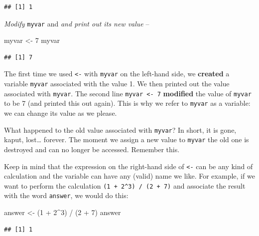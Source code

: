 \documentclass[
]{book}
\newenvironment{Shaded}{\begin{snugshade}}{\end{snugshade}}
\newcommand{\DecValTok}[1]{\textcolor[rgb]{0.00,0.00,0.81}{#1}}
\newcommand{\NormalTok}[1]{#1}
\newcommand{\OtherTok}[1]{\textcolor[rgb]{0.56,0.35,0.01}{#1}}
\newcommand{\SpecialCharTok}[1]{\textcolor[rgb]{0.00,0.00,0.00}{#1}}
\begin{document}
\begin{verbatim}
## [1] 1
\end{verbatim}

\emph{Modify} \texttt{myvar} and \emph{and print out its new value} --

\begin{Shaded}
\begin{Highlighting}[]
\NormalTok{myvar }\OtherTok{\textless{}{-}} \DecValTok{7}
\NormalTok{myvar}
\end{Highlighting}
\end{Shaded}

\begin{verbatim}
## [1] 7
\end{verbatim}

The first time we used \texttt{\textless{}-} with \texttt{myvar} on the left-hand side, we \textbf{created} a variable \texttt{myvar} associated with the value 1. We then printed out the value associated with \texttt{myvar}. The second line \texttt{myvar\ \textless{}-\ 7} \textbf{modified} the value of \texttt{myvar} to be 7 (and printed this out again). This is why we refer to \texttt{myvar} as a variable: we can change its value as we please.

What happened to the old value associated with \texttt{myvar}? In short, it is gone, kaput, lost\ldots{} forever. The moment we assign a new value to \texttt{myvar} the old one is destroyed and can no longer be accessed. Remember this.

Keep in mind that the expression on the right-hand side of \texttt{\textless{}-} can be any kind of calculation and the variable can have any (valid) name we like. For example, if we want to perform the calculation \texttt{(1\ +\ 2\^{}3)\ /\ (2\ +\ 7)} and associate the result with the word \texttt{answer}, we would do this:

\begin{Shaded}
\begin{Highlighting}[]
\NormalTok{answer }\OtherTok{\textless{}{-}}\NormalTok{ (}\DecValTok{1} \SpecialCharTok{+} \DecValTok{2}\SpecialCharTok{\^{}}\DecValTok{3}\NormalTok{) }\SpecialCharTok{/}\NormalTok{ (}\DecValTok{2} \SpecialCharTok{+} \DecValTok{7}\NormalTok{)}
\NormalTok{answer}
\end{Highlighting}
\end{Shaded}

\begin{verbatim}
## [1] 1
\end{verbatim}
\end{document}
